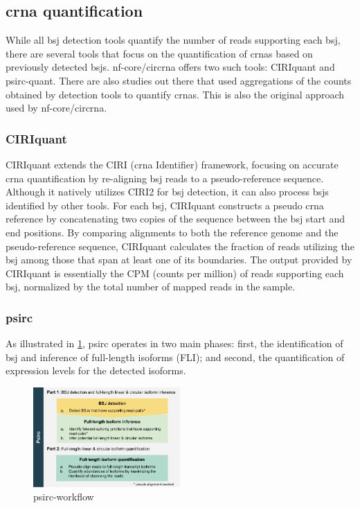 \subsection{\gls{crna} quantification}
\label{sec:crna_quantification}

While all \gls{bsj} detection tools quantify the number of reads supporting
each \gls{bsj}, there are several tools that focus on the quantification of
\glspl{crna} based on previously detected \glspl{bsj}.
nf-core/circrna offers two such tools: CIRIquant and
psirc-quant.
There are also studies out there that used aggregations of the counts obtained
by detection tools to quantify \glspl{crna}\supercite{gaffo_sensitive_2022}.
This is also the original approach used by
nf-core/circrna\supercite{digby_nf-corecircrna_2023}.

\subsubsection{CIRIquant}
\label{sec:ciriquant}
CIRIquant extends the CIRI (\Gls{crna} Identifier) framework, focusing on
accurate \gls{crna} quantification by re-aligning \gls{bsj} reads to a
pseudo-reference sequence.
Although it natively utilizes CIRI2 for \gls{bsj} detection, it can also
process \glspl{bsj} identified by other tools\supercite{zhang_accurate_2020}.
For each \gls{bsj}, CIRIquant constructs a pseudo \gls{crna} reference by
concatenating two copies of the sequence between the \gls{bsj} start and end
positions.
By comparing alignments to both the reference genome and the pseudo-reference
sequence, CIRIquant calculates the fraction of reads utilizing the \gls{bsj}
among those that span at least one of its
boundaries\supercite{zhang_accurate_2020}.
The output provided by CIRIquant is essentially the CPM (counts per million) of
reads supporting each \gls{bsj}, normalized by the total number of mapped reads
in the sample.

\subsubsection{psirc}
\label{sec:psirc}
As illustrated in \cref{fig:psirc_workflow}, psirc operates in two main phases:
first, the identification of \gls{bsj} and inference of full-length isoforms
(FLI); and second, the quantification of expression levels for the detected
isoforms\supercite{yu_quantifying_2021}.

\begin{figure}[ht] \centering

    \includegraphics[width=0.5\textwidth]{chapters/3_materials_and_methods/figures/psirc_pipeline.png}
    \caption{psirc-workflow} \label{fig:psirc_workflow} \end{figure}

